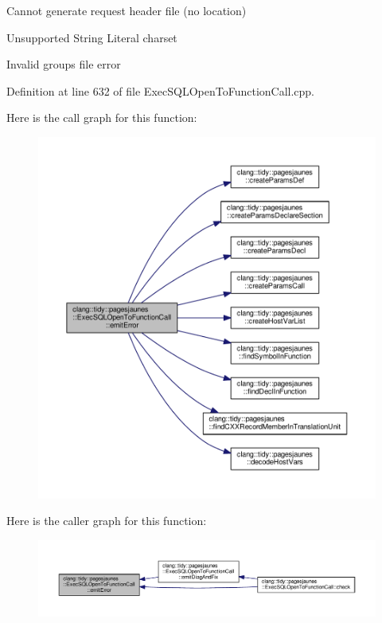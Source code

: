 Cannot generate request header file (no location)

Unsupported String Literal charset

Invalid groups file error 

Definition at line 632 of file Exec\+S\+Q\+L\+Open\+To\+Function\+Call.\+cpp.

Here is the call graph for this function\+:
\nopagebreak
\begin{figure}[H]
\begin{center}
\leavevmode
\includegraphics[width=350pt]{classclang_1_1tidy_1_1pagesjaunes_1_1_exec_s_q_l_open_to_function_call_a8bf527ab87666c879c7fcb9410a52878_cgraph}
\end{center}
\end{figure}
Here is the caller graph for this function\+:
\nopagebreak
\begin{figure}[H]
\begin{center}
\leavevmode
\includegraphics[width=350pt]{classclang_1_1tidy_1_1pagesjaunes_1_1_exec_s_q_l_open_to_function_call_a8bf527ab87666c879c7fcb9410a52878_icgraph}
\end{center}
\end{figure}
\mbox{\label{classclang_1_1tidy_1_1pagesjaunes_1_1_exec_s_q_l_open_to_function_call_a873f655e036659f80ff9478510e0e556}} 
